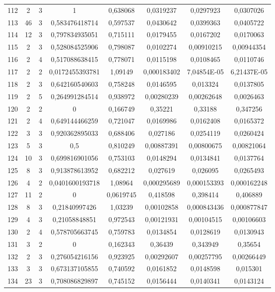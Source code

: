 \begin{longtable}{|c|c|c|c|c|c|c|c|}
112 & 2 & 3 & 1 & 0,638068 & 0,0319237 & 0,0297923 & 0,0307026  \\
113 & 46 & 3 & 0,583476418714 & 0,597537 & 0,0430642 & 0,0399363 & 0,0405722  \\
114 & 12 & 3 & 0,797834935051 & 0,715111 & 0,0179455 & 0,0167202 & 0,0170063  \\
115 & 2 & 3 & 0,528084525906 & 0,798087 & 0,0102274 & 0,00910215 & 0,00944354  \\
116 & 2 & 4 & 0,517088638415 & 0,778071 & 0,0115198 & 0,0108465 & 0,0110746  \\
117 & 2 & 2 & 0,0172455393781 & 1,09149 & 0,000183402 & 7,04854E-05 & 6,21437E-05  \\
118 & 2 & 3 & 0,642160540603 & 0,758248 & 0,0146595 & 0,013324 & 0,0137805  \\
119 & 2 & 5 & 0,264991284514 & 0,938972 & 0,00280239 & 0,00262648 & 0,0026463  \\
120 & 2 & 2 & 0 & 0,166749 & 0,35221 & 0,33188 & 0,347256  \\
121 & 2 & 4 & 0,649144466259 & 0,721047 & 0,0169986 & 0,0162408 & 0,0165372  \\
122 & 3 & 3 & 0,920362895033 & 0,688406 & 0,027186 & 0,0254119 & 0,0260424  \\
123 & 5 & 3 & 0,5 & 0,810249 & 0,00887391 & 0,00800675 & 0,00821064  \\
124 & 10 & 3 & 0,699816901056 & 0,753103 & 0,0148294 & 0,0134841 & 0,0137764  \\
125 & 8 & 3 & 0,913878613952 & 0,682212 & 0,027619 & 0,026095 & 0,0265493  \\
126 & 4 & 2 & 0,0401600193718 & 1,08964 & 0,000295689 & 0,000153393 & 0,000162248  \\
127 & 11 & 2 & 0 & 0,0619745 & 0,418598 & 0,398414 & 0,406889  \\
128 & 8 & 3 & 0,21840997426 & 1,03239 & 0,00102858 & 0,000843436 & 0,000877847  \\
129 & 4 & 3 & 0,21058848851 & 0,972543 & 0,00121931 & 0,00104515 & 0,00106603  \\
130 & 2 & 4 & 0,578705663745 & 0,759783 & 0,0134854 & 0,0128619 & 0,0130943  \\
131 & 3 & 2 & 0 & 0,162343 & 0,36439 & 0,343949 & 0,35654  \\
132 & 2 & 3 & 0,276054216156 & 0,923925 & 0,00292607 & 0,00257795 & 0,00266449  \\
133 & 3 & 3 & 0,673137105855 & 0,740592 & 0,0161852 & 0,0148598 & 0,015301  \\
134 & 23 & 3 & 0,708086829897 & 0,745152 & 0,0156444 & 0,0140341 & 0,0143124  \\

\end{longtable}

